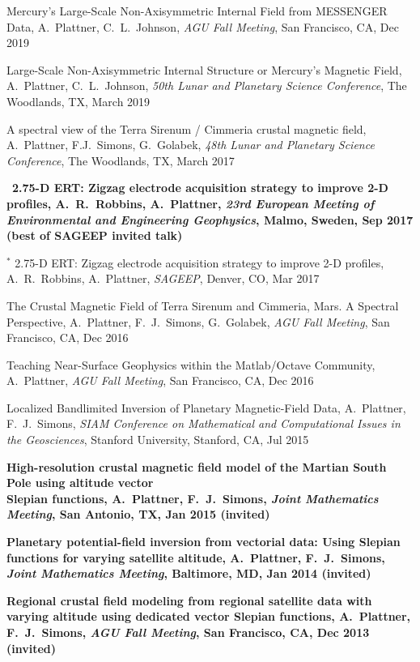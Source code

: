 \documentclass[10pt]{article}
\begin{document}
\spcp
Mercury's Large-Scale Non-Axisymmetric Internal Field from MESSENGER Data, A.~Plattner, C.~L.~Johnson, \emph{AGU Fall Meeting}, San Francisco, CA, Dec 2019

\spcp
Large-Scale Non-Axisymmetric Internal Structure or Mercury's Magnetic Field,
A.~Plattner, C.~L.~Johnson, \emph{50th Lunar and Planetary Science Conference},
The Woodlands, TX, March 2019

\spcp
A spectral view of the Terra Sirenum / Cimmeria crustal magnetic field, A.~Plattner, F.J.~Simons, G.~Golabek, \emph{48th Lunar and Planetary Science Conference}, The Woodlands, TX, March 2017

\newpage
\hspace{-0.4cm}\ug \, \textbf{2.75-D ERT: Zigzag electrode acquisition strategy
to improve 2-D profiles,
A.~R.~Robbins, A.~Plattner,
\emph{23rd European Meeting of Environmental and Engineering Geophysics}, Malmo, Sweden, Sep 2017 (best of SAGEEP invited talk)}

\spcp 
\hspace{-0.4cm} $^*$ 2.75-D ERT: Zigzag electrode acquisition strategy
to improve 2-D profiles,
A.~R.~Robbins, A.~Plattner,
\emph{SAGEEP}, Denver, CO, Mar 2017

\spcp
The Crustal Magnetic Field of Terra Sirenum and Cimmeria, Mars. A Spectral Perspective,
A.~Plattner, F.~J.~Simons, G.~Golabek, 
\emph{AGU Fall Meeting}, San Francisco, CA, Dec 2016

\spcp
Teaching Near-Surface Geophysics within the Matlab/Octave Community,
A.~Plattner, 
\emph{AGU Fall Meeting}, San Francisco, CA, Dec 2016

\spcp
Localized Bandlimited Inversion of Planetary Magnetic-Field Data,
A.~Plattner, F.~J.~Simons,
\emph{SIAM Conference on Mathematical and Computational Issues in the Geosciences},
Stanford University, Stanford, CA, Jul 2015


\spcp
\textbf{High-resolution crustal magnetic field model of the Martian South Pole using altitude vector\\ Slepian functions,
A.~Plattner, F.~J.~Simons,
\emph{Joint Mathematics Meeting}, San Antonio, TX, Jan 2015 (invited)}

\spcp
\textbf{Planetary potential-field inversion from vectorial data: Using Slepian functions for varying satellite altitude,
A.~Plattner, F.~J.~Simons,
\emph{Joint Mathematics Meeting}, Baltimore, MD, Jan 2014 (invited)}

\spcp
\textbf{Regional crustal field modeling from regional satellite data with varying altitude using dedicated vector Slepian functions,
A.~Plattner, F.~J.~Simons,
\emph{AGU Fall Meeting}, San Francisco, CA, Dec 2013 (invited)}
\end{document}
